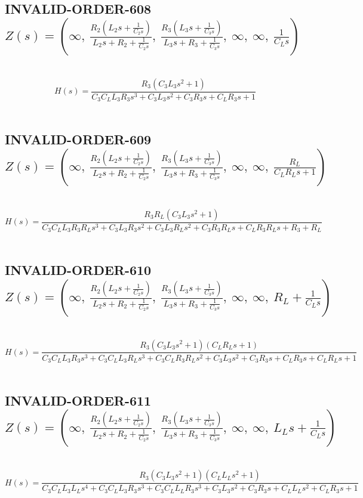 \documentclass{article}
\begin{document}
\subsection{INVALID-ORDER-608 $Z(s) = \left( \infty, \  \frac{R_{2} \left(L_{2} s + \frac{1}{C_{2} s}\right)}{L_{2} s + R_{2} + \frac{1}{C_{2} s}}, \  \frac{R_{3} \left(L_{3} s + \frac{1}{C_{3} s}\right)}{L_{3} s + R_{3} + \frac{1}{C_{3} s}}, \  \infty, \  \infty, \  \frac{1}{C_{L} s}\right)$ } \ 
\textbf{\[H(s) = \frac{R_{3} \left(C_{3} L_{3} s^{2} + 1\right)}{C_{3} C_{L} L_{3} R_{3} s^{3} + C_{3} L_{3} s^{2} + C_{3} R_{3} s + C_{L} R_{3} s + 1}\] } \ 
\subsection{INVALID-ORDER-609 $Z(s) = \left( \infty, \  \frac{R_{2} \left(L_{2} s + \frac{1}{C_{2} s}\right)}{L_{2} s + R_{2} + \frac{1}{C_{2} s}}, \  \frac{R_{3} \left(L_{3} s + \frac{1}{C_{3} s}\right)}{L_{3} s + R_{3} + \frac{1}{C_{3} s}}, \  \infty, \  \infty, \  \frac{R_{L}}{C_{L} R_{L} s + 1}\right)$ } \ 
\textbf{\[H(s) = \frac{R_{3} R_{L} \left(C_{3} L_{3} s^{2} + 1\right)}{C_{3} C_{L} L_{3} R_{3} R_{L} s^{3} + C_{3} L_{3} R_{3} s^{2} + C_{3} L_{3} R_{L} s^{2} + C_{3} R_{3} R_{L} s + C_{L} R_{3} R_{L} s + R_{3} + R_{L}}\] } \ 
\subsection{INVALID-ORDER-610 $Z(s) = \left( \infty, \  \frac{R_{2} \left(L_{2} s + \frac{1}{C_{2} s}\right)}{L_{2} s + R_{2} + \frac{1}{C_{2} s}}, \  \frac{R_{3} \left(L_{3} s + \frac{1}{C_{3} s}\right)}{L_{3} s + R_{3} + \frac{1}{C_{3} s}}, \  \infty, \  \infty, \  R_{L} + \frac{1}{C_{L} s}\right)$ } \ 
\textbf{\[H(s) = \frac{R_{3} \left(C_{3} L_{3} s^{2} + 1\right) \left(C_{L} R_{L} s + 1\right)}{C_{3} C_{L} L_{3} R_{3} s^{3} + C_{3} C_{L} L_{3} R_{L} s^{3} + C_{3} C_{L} R_{3} R_{L} s^{2} + C_{3} L_{3} s^{2} + C_{3} R_{3} s + C_{L} R_{3} s + C_{L} R_{L} s + 1}\] } \ 
\subsection{INVALID-ORDER-611 $Z(s) = \left( \infty, \  \frac{R_{2} \left(L_{2} s + \frac{1}{C_{2} s}\right)}{L_{2} s + R_{2} + \frac{1}{C_{2} s}}, \  \frac{R_{3} \left(L_{3} s + \frac{1}{C_{3} s}\right)}{L_{3} s + R_{3} + \frac{1}{C_{3} s}}, \  \infty, \  \infty, \  L_{L} s + \frac{1}{C_{L} s}\right)$ } \ 
\textbf{\[H(s) = \frac{R_{3} \left(C_{3} L_{3} s^{2} + 1\right) \left(C_{L} L_{L} s^{2} + 1\right)}{C_{3} C_{L} L_{3} L_{L} s^{4} + C_{3} C_{L} L_{3} R_{3} s^{3} + C_{3} C_{L} L_{L} R_{3} s^{3} + C_{3} L_{3} s^{2} + C_{3} R_{3} s + C_{L} L_{L} s^{2} + C_{L} R_{3} s + 1}\] } \ 
\end{document}
